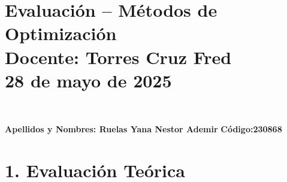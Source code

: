 \documentclass[a4paper,10pt]{article}
\begin{document}
\section*{Evaluación – Métodos de Optimización \\{Docente: Torres Cruz Fred } \\ \large 28 de mayo de 2025} \

\vspace{0.5cm}
\textbf{Apellidos y Nombres:  Ruelas Yana Nestor Ademir }  \hfill \textbf{Código:230868} 

\vspace{0.5cm}
\section*{1. Evaluación Teórica}
\end{document}
